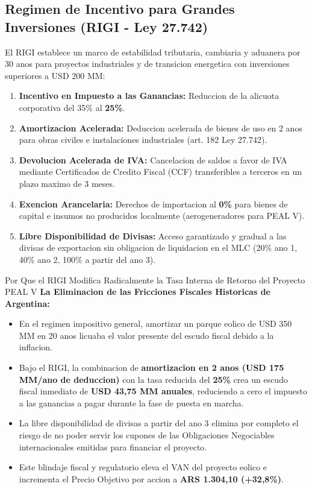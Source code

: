 \documentclass[10pt,a4paper]{article}
\theoremstyle{definition}
\begin{document}
\subsection{Regimen de Incentivo para Grandes Inversiones (RIGI - Ley 27.742)}
El RIGI establece un marco de estabilidad tributaria, cambiaria y aduanera por 30 anos para proyectos industriales y de transicion energetica con inversiones superiores a USD 200 MM:
\begin{enumerate}
    \item \textbf{Incentivo en Impuesto a las Ganancias:} Reduccion de la alicuota corporativa del 35\% al \textbf{25\%}.
    \item \textbf{Amortizacion Acelerada:} Deduccion acelerada de bienes de uso en 2 anos para obras civiles e instalaciones industriales (art. 182 Ley 27.742).
    \item \textbf{Devolucion Acelerada de IVA:} Cancelacion de saldos a favor de IVA mediante Certificados de Credito Fiscal (CCF) transferibles a terceros en un plazo maximo de 3 meses.
    \item \textbf{Exencion Arancelaria:} Derechos de importacion al \textbf{0\%} para bienes de capital e insumos no producidos localmente (aerogeneradores para PEAL V).
    \item \textbf{Libre Disponibilidad de Divisas:} Acceso garantizado y gradual a las divisas de exportacion sin obligacion de liquidacion en el MLC (20\% ano 1, 40\% ano 2, 100\% a partir del ano 3).
\end{enumerate}

\begin{conceptbox}{Por Que el RIGI Modifica Radicalmente la Tasa Interna de Retorno del Proyecto PEAL V}
\textbf{La Eliminacion de las Fricciones Fiscales Historicas de Argentina:}
\begin{itemize}
    \item En el regimen impositivo general, amortizar un parque eolico de USD 350 MM en 20 anos licuaba el valor presente del escudo fiscal debido a la inflacion.
    \item Bajo el RIGI, la combinacion de \textbf{amortizacion en 2 anos (USD 175 MM/ano de deduccion)} con la tasa reducida del \textbf{25\%} crea un escudo fiscal inmediato de \textbf{USD 43,75 MM anuales}, reduciendo a cero el impuesto a las ganancias a pagar durante la fase de puesta en marcha.
    \item La libre disponibilidad de divisas a partir del ano 3 elimina por completo el riesgo de no poder servir los cupones de las Obligaciones Negociables internacionales emitidas para financiar el proyecto.
    \item Este blindaje fiscal y regulatorio eleva el VAN del proyecto eolico e incrementa el Precio Objetivo por accion a \textbf{ARS 1.304,10 (+32,8\%)}.
\end{itemize}
\end{conceptbox}
\end{document}
